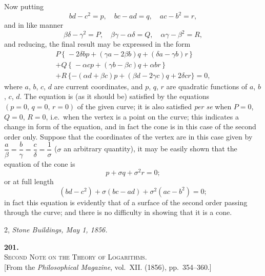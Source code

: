 \documentclass[11pt]{article}
\begin{document}
\clearpage

Now putting
\[
bd-c^{2}=p,\quad bc-ad=q,\quad ac-b^{2}=r,
\]
and in like manner
\[
\beta\delta-\gamma^{2}=P,\quad \beta\gamma-\alpha\delta=Q,\quad \alpha\gamma-\beta^{2}=R,
\]
and reducing, the final result may be expressed in the form
\[
\begin{aligned}
P\,\{\;-2\delta b p + (\gamma a - 2\beta b)q + (\delta a - \gamma b)r\,\}\\
+ Q\,\{\;-\alpha c p + (\gamma b - \beta c)q + \alpha b r\,\}\\
+ R\,\{-(\alpha d+\beta c)p + (\beta d - 2\gamma c)q + 2\delta c r\}=0,
\end{aligned}
\]
where $a$, $b$, $c$, $d$ are current coordinates, and $p$, $q$, $r$ are quadratic functions of $a$, $b$, $c$, $d$. The equation is (as it should be) satisfied by the equations $(p=0,\,q=0,\,r=0)$ of the given curve; it is also satisfied \emph{per se} when $P=0$, $Q=0$, $R=0$, i.e.\ when the vertex is a point on the curve; this indicates a change in form of the equation, and in fact the cone is in this case of the second order only. Suppose that the coordinates of the vertex are in this case given by $\dfrac{a}{\beta}=\dfrac{b}{\gamma}=\dfrac{c}{\delta}=\dfrac{1}{\sigma}$ ($\sigma$ an arbitrary quantity), it may be easily shown that the equation of the cone is
\[
p+\sigma q+\sigma^{2}r=0;
\]
or at full length
\[
(bd-c^{2})+\sigma(bc-ad)+\sigma^{2}(ac-b^{2})=0;
\]
in fact this equation is evidently that of a surface of the second order passing through the curve; and there is no difficulty in showing that it is a cone.

\medskip
\hfill 2, \emph{Stone Buildings, May 1, 1856.}

\clearpage


\begin{center}
\textbf{\large 201.}\\[6pt]
\textsc{Second Note on the Theory of Logarithms.}\\[4pt]
\small [From the \emph{Philosophical Magazine}, vol.\ XII. (1856), pp.\ 354--360.]
\end{center}

\medskip
\end{document}
